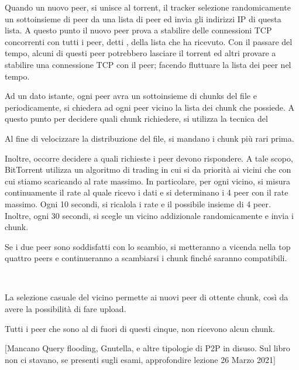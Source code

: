 \documentclass{book}
\newcommand{\tmtextbf}[1]{\text{{\bfseries{#1}}}}
\begin{document}
Quando un nuovo peer, si unisce al torrent, il tracker selezione
randomicamente un sottoinsieme di peer da una lista di peer ed invia gli
indirizzi IP di questa lista. A questo punto il nuovo peer prova a stabilire
delle connessioni TCP concorrenti con tutti i peer, detti \tmtextbf{peer
vicini}, della lista che ha ricevuto. Con il passare del tempo, alcuni di
questi peer potrebbero lasciare il torrent ed altri provare a stabilire una
connessione TCP con il peer; facendo fluttuare la lista dei peer nel tempo.

Ad un dato istante, ogni peer avra un sottoinsieme di chunks del file e
periodicamente, si chiedera ad ogni peer vicino la lista dei chunk che
possiede. A questo punto per decidere quali chunk richiedere, si utilizza la
tecnica del \tmtextbf{il pi{\`u} raro prima.}

Al fine di velocizzare la distribuzione del file, si mandano i chunk pi{\`u}
rari prima.

Inoltre, occorre decidere a quali richieste i peer devono rispondere. A tale
scopo, BitTorrent utilizza un algoritmo di trading in cui si da priorit{\`a}
ai vicini che con cui stiamo scaricando al rate massimo. In particolare, per
ogni vicino, si misura continuamente il rate al quale ricevo i dati e si
determinano i 4 peer con il rate massimo. Ogni 10 secondi, si ricalola i rate
e il possibile insieme di 4 peer. Inoltre, ogni 30 secondi, si scegle un
vicino addizionale randomicamente e invia i chunk.

Se i due peer sono soddisfatti con lo scambio, si metteranno a vicenda nella
top quattro peers e continueranno a scambiarsi i chunk finch{\'e} saranno
compatibili.

\begin{note}
  \
  
  La selezione casuale del vicino permette ai nuovi peer di ottente chunk,
  cos{\`i} da avere la possibilit{\`a} di fare upload.
  
  Tutti i peer che sono al di fuori di questi cinque, non ricevono alcun
  chunk.
\end{note}

[Mancano Query flooding, Gnutella, e altre tipologie di P2P in disuso. Sul
libro non ci stavano, se presenti sugli esami, approfondire lezione 26 Marzo
2021]
{}
\end{document}
